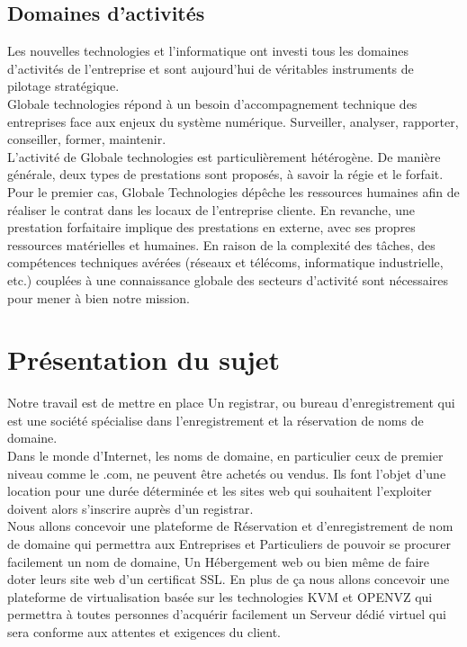 \documentclass[a4paper, 12pt]{report}
\begin{document}
\subsection{Domaines d'activités}
\noindent Les nouvelles technologies et l’informatique ont investi tous les domaines d’activités de l’entreprise et sont aujourd’hui de véritables instruments de pilotage stratégique.
\\
\noindent Globale technologies répond à un besoin d’accompagnement technique des entreprises face aux enjeux du système numérique. Surveiller, analyser, rapporter, conseiller, former, maintenir. 
\\
\noindent L’activité de Globale technologies est particulièrement hétérogène.
De manière générale, deux types de prestations sont proposés, à savoir la régie et le forfait. Pour le premier cas, Globale Technologies dépêche les ressources humaines afin de réaliser le contrat dans les locaux de l’entreprise cliente. En revanche, une prestation forfaitaire implique des prestations en externe, avec ses propres ressources matérielles et humaines. En raison de la complexité des tâches, des compétences techniques avérées (réseaux et télécoms, informatique industrielle, etc.) couplées à une connaissance globale des secteurs d’activité sont nécessaires pour mener à bien notre mission.

\section{Présentation du sujet}
\noindent Notre travail est de mettre en place Un registrar, ou bureau d'enregistrement qui est une société spécialise dans l'enregistrement et la réservation de noms de domaine.
\\
\noindent
Dans le monde d'Internet, les noms de domaine, en particulier ceux de premier niveau comme le .com, ne peuvent être achetés ou vendus. Ils font l'objet d'une location pour une durée déterminée et les sites web qui souhaitent l'exploiter doivent alors s'inscrire auprès d'un registrar.
\\
Nous allons concevoir une plateforme de Réservation et d’enregistrement de nom de domaine qui permettra aux Entreprises et Particuliers de pouvoir se procurer facilement un nom de domaine, Un Hébergement web ou bien même de faire doter leurs site web d’un certificat SSL.
En plus de ça nous allons concevoir une plateforme de virtualisation basée sur les technologies KVM et OPENVZ qui permettra à toutes personnes d’acquérir facilement un Serveur dédié virtuel qui sera conforme aux attentes et exigences du client.
\end{document}
